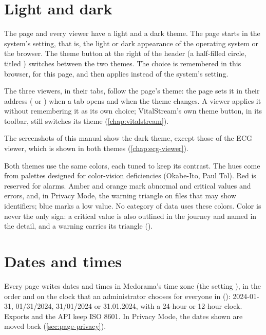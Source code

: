 \section{Light and dark}
\label{sec:page-themes}

The page and every viewer have a light and a dark theme. The page starts in the system's setting,
that is, the light or dark appearance of the operating system or the browser. The theme button at
the right of the header (a half-filled circle, titled ) switches between the
two themes. The choice is remembered in this browser, for this page, and then applies instead of
the system's setting.

The three viewers, in their tabs, follow the page's theme: the page sets it in their address
( or ) when a tab opens and when the theme changes. A viewer
applies it without remembering it as its own choice; VitalStream's own theme button, in its
toolbar, still switches its theme (\cref{chap:vitalstream}).

The screenshots of this manual show the dark theme, except those of the ECG viewer, which is
shown in both themes (\cref{chap:ecg-viewer}).


Both themes use the same colors, each tuned to keep its contrast. The hues come from palettes
designed for color-vision deficiencies (Okabe-Ito, Paul Tol). Red is reserved for alarms. Amber
and orange mark abnormal and critical values and errors, and, in Privacy Mode, the warning
triangle on files that may show identifiers; blue marks a low value. No category of data uses
these colors. Color is never the only sign: a critical value is also outlined in the journey
and named  in the detail, and a warning carries its triangle (\ui{$\blacktriangle$}).

\section{Dates and times}
\label{sec:page-dates}

Every page writes dates and times in Medorama's time zone (the setting ), in
the order and on the clock that an administrator chooses for everyone in 
(): 2024-01-31, 01/31/2024, 31/01/2024 or 31.01.2024, with a 24-hour or
12-hour clock. Exports and
the API keep ISO 8601. In Privacy Mode, the dates shown are moved back
(\cref{sec:page-privacy}).

